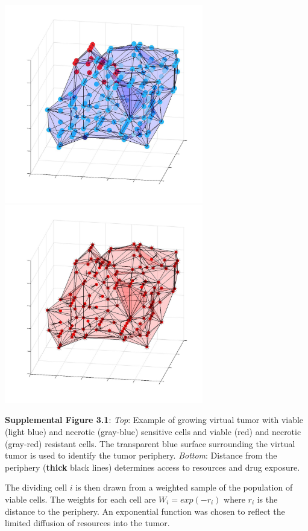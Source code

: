 \documentclass{article}
\begin{document}
\begin{center}
\includegraphics[width=0.65\textwidth , height=0.65\textwidth]{TumorBoundary}
\includegraphics[width=0.65\textwidth , height=0.65\textwidth]{PeripheryDistance}

\textbf{Supplemental Figure 3.1}: \textit{Top}: Example of growing virtual tumor with viable (light blue) and necrotic (gray-blue) sensitive cells and viable (red) and necrotic (gray-red) resistant cells.  The transparent blue surface surrounding the virtual tumor is used to identify the tumor periphery.  \textit{Bottom}: Distance from the periphery (\textbf{thick} black lines) determines access to resources and drug exposure.
\end{center}

The dividing cell $i$ is then drawn from a weighted sample of the population of viable cells.  The weights for each cell are $W_i=exp(-r_i)$ where $r_i$ is the distance to the periphery.  An exponential function was chosen to reflect the limited diffusion of resources into the tumor.
 
\end{document}
